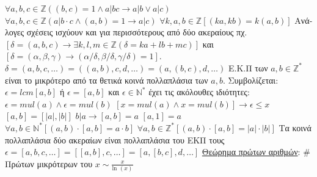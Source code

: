 \documentclass[12pt]{article}
\def\ln{\text{ln\ }} %
\begin{document}
\begin{flushleft}
	\textbullet \quad $\forall a, b, c \in \mathbb{Z} \left((b,c) = 1 \land a|bc \rightarrow a|b \lor a|c \right) $ \linebreak 
	\textbullet \quad $ \forall a, b, c \in \mathbb{Z} \left( a|b\cdot c \land (a,b) = 1 \rightarrow a|c \right) $ \linebreak 
	\textbullet \quad $ \forall k, a, b \in \mathbb{Z} \left[ (ka, kb) = k(a, b) \right] $ \linebreak 
		\textgreek{Ανάλογες σχέσεις ισχύουν και για περισσότερους από δύο ακεραίους πχ.} $\left[ \delta = (a, b, c) \rightarrow \exists k, l, m \in \mathbb{Z} (\delta = ka + lb + mc) \right]$ \textgreek{και} $\left[ \delta = (\alpha, \beta, \gamma) \rightarrow (\alpha / \delta, \beta / \delta, \gamma / \delta) = 1 \right] $. \linebreak 
	\textbullet \quad $\delta = (a, b, c, \ldots) = ((a,b), c, d, \ldots) = (a, (b,c), d, \ldots) $ \linebreak 
	\textbullet \quad \textgreek{Ε.Κ.Π των} $a, b \in \mathbb{Z}^* $ \textgreek{είναι το μικρότερο από τα θετικά κοινά πολλαπλάσια των} $a, b$. \textgreek{Συμβολίζεται}: $\epsilon = lcm [a,b] $ \textgreek{ή} $\epsilon = [a,b]$ \textgreek{και} $\epsilon \in \mathbb{N}^*$ \textgreek{έχει τις ακόλουθες ιδιότητες}: \linebreak 
	\qquad $\epsilon = mul(a) \land \epsilon = mul(b) $ \linebreak 
	\qquad $[x= mul(a) \land x = mul(b) ] \rightarrow \epsilon \leq x $ \linebreak 
	\textbullet \quad $[a,b] = [|a|, |b|] $ \linebreak 
	\textbullet \quad $b|a \rightarrow [a, b] = a $ \linebreak 
	\textbullet \quad $ [a, 1] = a$ \linebreak 
	\textbullet \quad $ \forall a, b \in \mathbb{N}^* \left[ (a,b) \cdot [a,b] = a\cdot b\right] $ \linebreak 
	\textbullet \quad $ \forall a, b \in \mathbb{Z}^* \left[ (a, b) \cdot [a, b] = |a|\cdot |b| \right] $ \linebreak 
	\textbullet \quad \textgreek{Τα κοινά πολλαπλάσια δύο ακεραίων είναι πολλαπλάσια του ΕΚΠ τους} \linebreak 
	\textbullet \quad $\epsilon = [a, b, c, \ldots] = [[a,b], c, \ldots] = [a, [b, c], d, \ldots] $ \linebreak 
	\textbullet \quad \uline{\textgreek{Θεώρημα πρώτων αριθμών}}: \# \textgreek{Πρώτων μικρότερων του} $x \sim \frac{x}{\ln(x)} $ \\

\end{flushleft}
\end{document}
